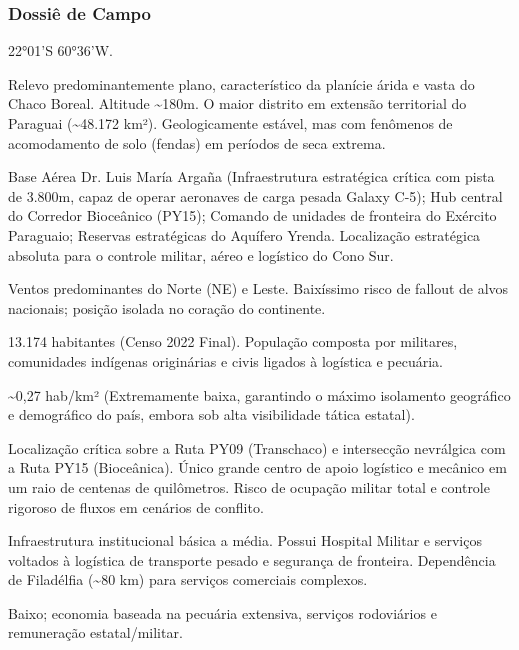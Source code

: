 \subsubsection{Dossiê de Campo}
\begin{description}[style=nextline,leftmargin=0.5cm,font=\bfseries]
\item[Coordenadas]  22°01'S 60°36'W.
\item[Topografia]  Relevo predominantemente plano, característico da planície árida e vasta do Chaco Boreal. Altitude \textasciitilde 180m. O maior distrito em extensão territorial do Paraguai (\textasciitilde 48.172 km²). Geologicamente estável, mas com fenômenos de acomodamento de solo (fendas) em períodos de seca extrema.
\item[Alvos Estratégicos]  Base Aérea Dr. Luis María Argaña (Infraestrutura estratégica crítica com pista de 3.800m, capaz de operar aeronaves de carga pesada Galaxy C-5); Hub central do Corredor Bioceânico (PY15); Comando de unidades de fronteira do Exército Paraguaio; Reservas estratégicas do Aquífero Yrenda. Localização estratégica absoluta para o controle militar, aéreo e logístico do Cono Sur.
\item[Fallout]  Ventos predominantes do Norte (NE) e Leste. Baixíssimo risco de fallout de alvos nacionais; posição isolada no coração do continente.
\item[População]  13.174 habitantes (Censo 2022 Final). População composta por militares, comunidades indígenas originárias e civis ligados à logística e pecuária.
\item[Densidade]  \textasciitilde 0,27 hab/\allowbreak km² (Extremamente baixa, garantindo o máximo isolamento geográfico e demográfico do país, embora sob alta visibilidade tática estatal).
\item[Vias de Acesso]  Localização crítica sobre a Ruta PY09 (Transchaco) e intersecção nevrálgica com a Ruta PY15 (Bioceânica). Único grande centro de apoio logístico e mecânico em um raio de centenas de quilômetros. Risco de ocupação militar total e controle rigoroso de fluxos em cenários de conflito.
\item[Serviços]  Infraestrutura institucional básica a média. Possui Hospital Militar e serviços voltados à logística de transporte pesado e segurança de fronteira. Dependência de Filadélfia (\textasciitilde 80 km) para serviços comerciais complexos.
\item[Custo de Vida]  Baixo; economia baseada na pecuária extensiva, serviços rodoviários e remuneração estatal/\allowbreak militar.

\end{description}
